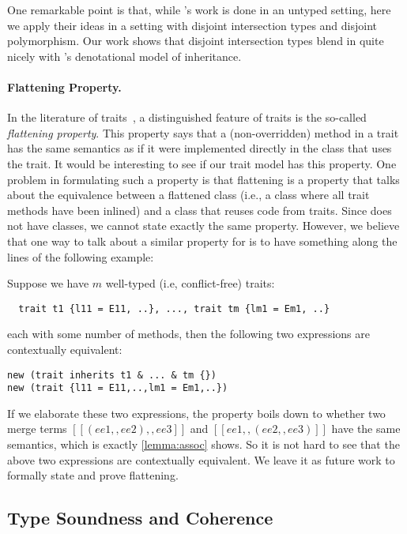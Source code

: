 One remarkable point is that, while \citeauthor{cook1989denotational}'s work is done in
an untyped setting, here we apply their ideas in a setting with
disjoint intersection types and disjoint polymorphism. Our work shows that
disjoint intersection types blend in quite nicely with \citeauthor{cook1989denotational}'s
denotational model of inheritance.

\paragraph{Flattening Property.}

In the literature of traits~\cite{Ducasse_2006, scharli2003traits, JOT:issue_2006_05/article4},
a distinguished feature of traits is the
so-called \textit{flattening property}. This property says that a (non-overridden) method in a
trait has the same semantics as if it were implemented directly in the class
that uses the trait. It would be interesting to see if our trait model has this
property. One problem in formulating such a property is that flattening is a
property that talks about the equivalence between a flattened class (i.e., a
class where all trait methods have been inlined) and a class that reuses code
from traits. Since \sedel does not have classes, we cannot state exactly the same
property. However, we believe that one way to talk about a similar property for \sedel is to have something
along the lines of the following example:
\begin{example}[Flattening]
Suppose we have $m$ well-typed (i.e, conflict-free) traits:
\begin{lstlisting}
  trait t1 {l11 = E11, ..}, ..., trait tm {lm1 = Em1, ..}
\end{lstlisting}
each with some number of methods, then the following two expressions are contextually equivalent:
\begin{lstlisting}
new (trait inherits t1 & ... & tm {})
new (trait {l11 = E11,..,lm1 = Em1,..})
\end{lstlisting}
\end{example}
If we elaborate these two expressions, the property boils down to whether two
merge terms $[[(ee1 ,, ee2) ,, ee3]]$ and $[[ee1 ,, (ee2 ,, ee3)]]$ have the
same semantics, which is exactly \cref{lemma:assoc} shows. So it is not hard to
see that the above two expressions are contextually equivalent. We leave it as
future work to formally state and prove flattening.

\subsection{Type Soundness and Coherence}

